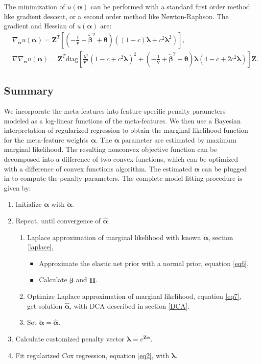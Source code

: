 The minimization of $u(\bm{\alpha})$ can be performed with a standard first order method like gradient descent, or a second order method like Newton-Raphson. The gradient and Hessian of $u(\bm{\alpha})$ are:
\begin{align*}
    &\nabla_{\bm{\alpha}} u(\bm{\alpha}) = \bm{Z}^T\left[(-\frac{1}{\bm{v}}+\tilde{\bm{\beta}}^2+\bm{\theta})((1-c)\bm{\lambda}+c^2\bm{\lambda}^2)\right],\\
    &\nabla\nabla_{\bm{\alpha}} u(\bm{\alpha}) = \bm{Z}^T \text{diag}\left[\frac{\bm{\lambda}^2}{\bm{v}^2}(1-c+c^2\bm{\lambda})^2+(-\frac{1}{\bm{v}}+\tilde{\bm{\beta}}^2+\bm{\theta})\bm{\lambda}(1-c+2c^2\bm{\lambda})\right]\bm{Z}.
\end{align*}

\subsection{Summary} \label{cha3_sum}
We incorporate the meta-features into feature-specific penalty parameters modeled as a log-linear functions of the meta-features. We then use a Bayesian interpretation of regularized regression to obtain the marginal likelihood function for the meta-feature weights $\bm{\alpha}$. The $\bm{\alpha}$ parameter are estimated by maximum marginal likelihood. The resulting nonconvex objective function can be decomposed into a difference of two convex functions, which can be optimized with a difference of convex functions algorithm. The estimated $\bm{\alpha}$ can be plugged in  to compute the penalty parameters. The complete model fitting procedure is given by:
\begin{enumerate}
    \item Initialize $\bm{\alpha}$ with $\tilde{\bm{\alpha}}$.
    \item Repeat, until convergence of $\hat{\bm{\alpha}}$.
    \begin{enumerate}
        \item Laplace approximation of marginal likelihood with known $\tilde{\bm{\alpha}}$, section \ref{laplace},
        \begin{itemize}
            \item Approximate the elastic net prior with a normal prior, equation \eqref{eq6},
            \item Calculate $\tilde{\bm{\beta}}$ and $\bm{H}$.
        \end{itemize}
        \item Optimize Laplace approximation of marginal likelihood, equation \eqref{eq7}, get solution $\hat{\bm{\alpha}}$, with DCA described in section \ref{DCA}.
        \item Set $\tilde{\bm{\alpha}} = \hat{\bm{\alpha}}$.
    \end{enumerate}
    \item Calculate customized penalty vector $\bm{\lambda}=e^{\bm{Z}\hat{\bm{\alpha}}}$.
    \item Fit regularized Cox regression, equation \eqref{eq2}, with $\bm{\lambda}$.
\end{enumerate}

